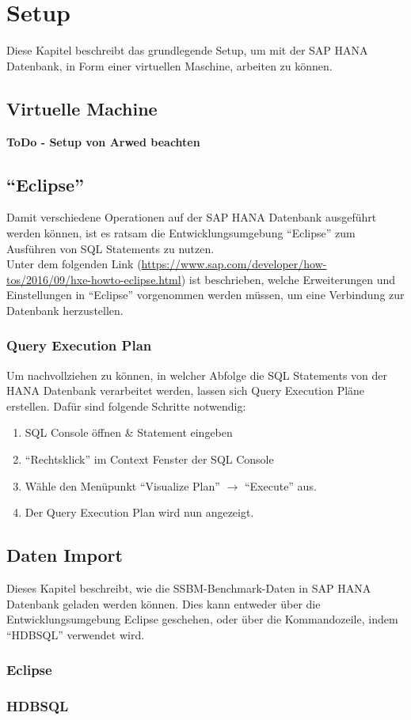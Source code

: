 \chapter{Setup}
Diese Kapitel beschreibt das grundlegende Setup, um mit der SAP HANA Datenbank, in Form einer virtuellen Maschine, arbeiten zu können.

\section{Virtuelle Machine}
\textbf{ToDo - Setup von Arwed beachten}


\section{\enquote{Eclipse}}
Damit verschiedene Operationen auf der SAP HANA Datenbank ausgeführt werden können, ist es ratsam die Entwicklungsumgebung \enquote{Eclipse} zum Ausführen von SQL Statements zu nutzen. \\Unter dem folgenden Link (\url{https://www.sap.com/developer/how-tos/2016/09/hxe-howto-eclipse.html}) ist beschrieben, welche Erweiterungen und Einstellungen in \enquote{Eclipse} vorgenommen werden müssen, um eine Verbindung zur Datenbank herzustellen.

\subsection{Query Execution Plan}
Um nachvollziehen zu können, in welcher Abfolge die SQL Statements von der HANA Datenbank verarbeitet werden, lassen sich Query Execution Pläne erstellen.
Dafür sind folgende Schritte notwendig:
\begin{enumerate}
	\item SQL Console öffnen \& Statement eingeben
	\item \enquote{Rechtsklick} im Context Fenster der SQL Console
	\item Wähle den Menüpunkt \enquote{Visualize Plan} $\rightarrow$ \enquote{Execute} aus.
	\item Der Query Execution Plan wird nun angezeigt.
\end{enumerate} 

\section{Daten Import}
Dieses Kapitel beschreibt, wie die SSBM-Benchmark-Daten in SAP HANA Datenbank geladen werden können. Dies kann entweder über die Entwicklungsumgebung Eclipse geschehen, oder über die Kommandozeile, indem \enquote{HDBSQL} verwendet wird.

\subsection{Eclipse}

\subsection{HDBSQL}

